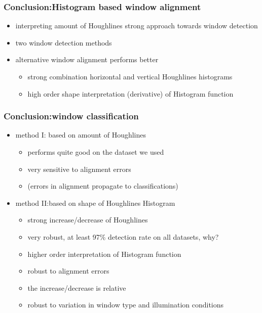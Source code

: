 \documentclass{beamer}
\begin{document}
\frame
{
	\frametitle{Conclusion:Histogram based window alignment}		

	\begin{itemize}
	\item interpreting amount of Houghlines strong approach towards window
	detection
	\item two window detection methods
	\item alternative window alignment performs better
		\begin{itemize}
		\item strong combination horizontal and vertical Houghlines histograms
		\item high order shape interpretation (derivative) of Histogram function
		\end{itemize}
	
	
	\end{itemize}

}
\frame
{
	\frametitle{Conclusion:window classification}		
	\begin{itemize}
	\item method I: based on amount of Houghlines
		\begin{itemize}
		\item performs quite good on the dataset we used
		\item very sensitive to alignment errors
		\item (errors in alignment propagate to classifications)
		\end{itemize}
	\item method II:based on shape of Houghlines Histogram
		\begin{itemize}
		\item strong increase/decrease of Houghlines
		\item very robust, at least 97\% detection rate on all datasets, why?
		\item higher order interpretation of Histogram function
		\item robust to alignment errors 
		\item the increase/decrease is relative
		\item robust to variation in window type and illumination conditions
		\end{itemize}
	\end{itemize}
}
\end{document}

